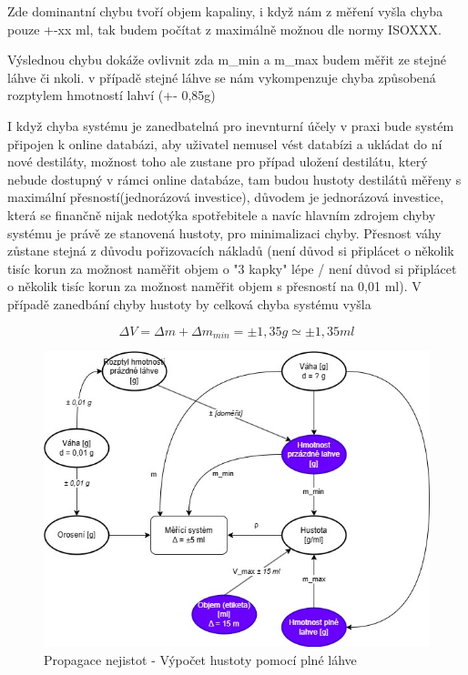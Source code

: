 Zde dominantní chybu tvoří objem kapaliny, i když nám z měření vyšla chyba pouze +-xx ml, tak budem počítat z maximálně možnou dle normy ISOXXX.

Výslednou chybu dokáže ovlivnit zda m\_min a m\_max budem měřit ze stejné láhve či nkoli. v případě stejné láhve se nám vykompenzuje chyba způsobená rozptylem hmotností lahví (+- 0,85g)

I když chyba systému je zanedbatelná pro inevnturní účely v praxi bude systém připojen k online databázi, aby uživatel nemusel vést databízi a ukládat do ní nové destiláty, možnost toho ale zustane pro případ uložení destilátu, který nebude dostupný v rámci online databáze, tam budou hustoty destilátů měřeny s maximální přesností(jednorázová investice), důvodem je jednorázová investice, která se finančně nijak nedotýka spotřebitele a navíc hlavním zdrojem chyby systému je právě ze stanovená hustoty, pro minimalizaci chyby. Přesnost váhy zůstane stejná z důvodu pořizovacích nákladů (není důvod si připlácet o několik tisíc korun za možnost naměřit objem o "3 kapky" lépe / není důvod si připlácet o několik tisíc korun za možnost naměřit objem s přesností na 0,01 ml). V případě zanedbání chyby hustoty by celková chyba systému vyšla 


\[\Delta V = \Delta m + \Delta m_{min} = \pm 1,35 g \simeq \pm 1,35 ml\]


\begin{figure}[H]
    \begin{center}
        \includegraphics[scale=0.6]{obrazky/Propagace nejistot-Metoda1+.jpg}
    \end{center}
    \caption{Propagace nejistot - Výpočet hustoty pomocí plné láhve}
\end{figure}

